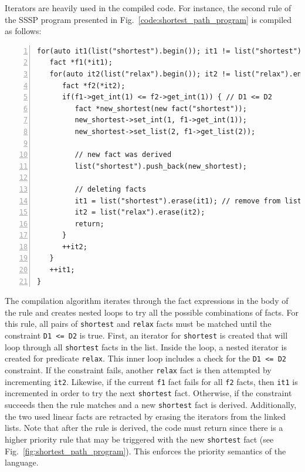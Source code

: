 Iterators are heavily used in the compiled code. For instance, the second rule
of the SSSP program presented in Fig.~\ref{code:shortest_path_program} is
compiled as follows:

\begin{Verbatim}[numbers=left,fontsize=\scriptsize,xleftmargin=\codemargin]
for(auto it1(list("shortest").begin()); it1 != list("shortest").end(); ) {
   fact *f1(*it1);
   for(auto it2(list("relax").begin()); it2 != list("relax").end(); ) {
      fact *f2(*it2);
      if(f1->get_int(1) <= f2->get_int(1)) { // D1 <= D2
         fact *new_shortest(new fact("shortest"));
         new_shortest->set_int(1, f1->get_int(1));
         new_shortest->set_list(2, f1->get_list(2));

         // new fact was derived
         list("shortest").push_back(new_shortest);

         // deleting facts
         it1 = list("shortest").erase(it1); // remove from list
         it2 = list("relax").erase(it2);
         return;
      }
      ++it2;
   }
   ++it1;
}
\end{Verbatim}


The compilation algorithm iterates through the fact expressions in the body of
the rule and creates nested loops to try all the possible combinations of facts.
For this rule, all pairs of \texttt{shortest} and \texttt{relax} facts must be
matched until the constraint \texttt{D1 <= D2} is true. First, an iterator for
\texttt{shortest} is created that will loop through all \texttt{shortest} facts
in the list. Inside the loop, a nested iterator is created for predicate
\texttt{relax}. This inner loop includes a check for the \texttt{D1 <= D2}
constraint. If the constraint fails, another \texttt{relax} fact is then
attempted by incrementing \texttt{it2}. Likewise, if the current \texttt{f1}
fact fails for all \texttt{f2} facts, then \texttt{it1} is incremented in order
to try the next \texttt{shortest} fact. Otherwise, if the constraint succeeds
then the rule matches and a new \texttt{shortest} fact is derived. Additionally,
the two used linear facts are retracted by erasing the iterators from the linked
lists.  Note that after the rule is derived, the code must return since there is
a higher priority rule that may be triggered with the new \texttt{shortest} fact
(see Fig.~\ref{fig:shortest_path_program}). This enforces the priority semantics
of the language.
    

